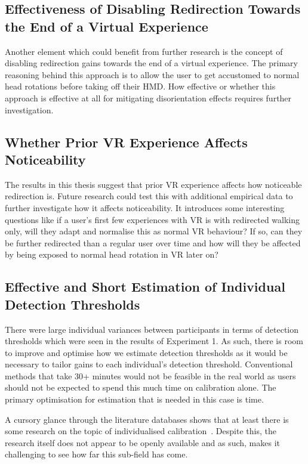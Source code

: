 \subsection{Effectiveness of Disabling Redirection Towards the End of a Virtual Experience}
Another element which could benefit from further research is the concept of disabling redirection gains towards the end of a virtual experience. The primary reasoning behind this approach is to allow the user to get accustomed to normal head rotations before taking off their HMD. How effective or whether this approach is effective at all for mitigating disorientation effects requires further investigation.
  
\subsection{Whether Prior VR Experience Affects Noticeability}
The results in this thesis suggest that prior VR experience affects how noticeable redirection is. Future research could test this with additional empirical data to further investigate how it affects noticeability. It introduces some interesting questions like if a user's first few experiences with VR is with redirected walking only, will they adapt and normalise this as normal VR behaviour? If so, can they be further redirected than a regular user over time and how will they be affected by being exposed to normal head rotation in VR later on?

\subsection{Effective and Short Estimation of Individual Detection Thresholds}   
There were large individual variances between participants in terms of detection thresholds which were seen in the results of Experiment 1. As such, there is room to improve and optimise how we estimate detection thresholds as it would be necessary to tailor gains to each individual's detection threshold. Conventional methods that take 30+ minutes would not be feasible in the real world as users should not be expected to spend this much time on calibration alone. The primary optimisation for estimation that is needed in this case is time. 

A cursory glance through the literature databases shows that at least there is some research on the topic of individualised calibration~\cite{hutton2018individualized}. Despite this, the research itself does not appear to be openly available and as such, makes it challenging to see how far this sub-field has come. 

